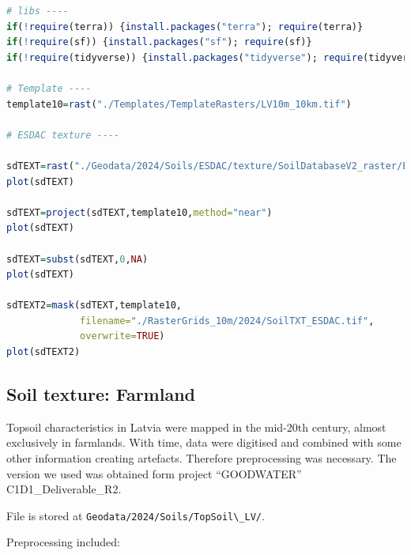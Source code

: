 \documentclass[
]{book}
\newcommand{\passthrough}[1]{#1}
\begin{document}
\begin{lstlisting}[language=R]
# libs ----
if(!require(terra)) {install.packages("terra"); require(terra)}
if(!require(sf)) {install.packages("sf"); require(sf)}
if(!require(tidyverse)) {install.packages("tidyverse"); require(tidyverse)}

# Template ----
template10=rast("./Templates/TemplateRasters/LV10m_10km.tif")

# ESDAC texture ----

sdTEXT=rast("./Geodata/2024/Soils/ESDAC/texture/SoilDatabaseV2_raster/ESDB-Raster-Library-1k-GeoTIFF-20240507/TEXT/TEXT.tif")
plot(sdTEXT)

sdTEXT=project(sdTEXT,template10,method="near")
plot(sdTEXT)

sdTEXT=subst(sdTEXT,0,NA)
plot(sdTEXT)

sdTEXT2=mask(sdTEXT,template10,
             filename="./RasterGrids_10m/2024/SoilTXT_ESDAC.tif",
             overwrite=TRUE)
plot(sdTEXT2)
\end{lstlisting}

\subsection{Soil texture: Farmland}\label{Ch04.07.03}

Topsoil characteristics in Latvia were mapped in the mid-20th century, almost
exclusively in farmlands. With time, data were digitised and combined with some
other information creating artefacts. Therefore preprocessing was necessary. The
version we used was obtained form project ``GOODWATER'' C1D1\_Deliverable\_R2.

File is stored at \passthrough{\lstinline!Geodata/2024/Soils/TopSoil\_LV/!}.

Preprocessing included:
\end{document}
